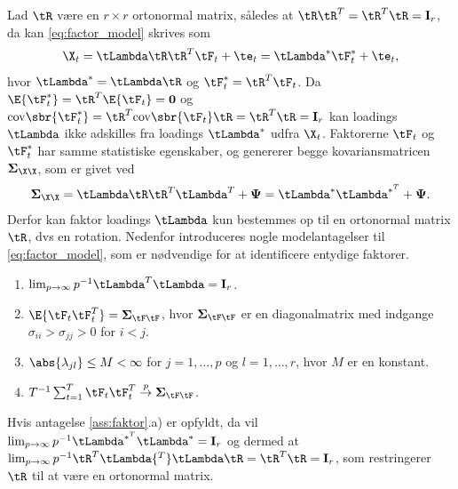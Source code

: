 Lad \(\tR\) være en \(r \times r\) ortonormal matrix, således at \(\tR \tR^T = \tR^T \tR = \mathbf{I}_r\), da kan \eqref{eq:factor_model} skrives som
\begin{align*}
\X_t = \tLambda \tR \tR^T \tF_t + \te_t = \tLambda^* \tF_t^* + \te_t,
\end{align*}
hvor \(\tLambda^*=\tLambda \tR\) og \(\tF_t^*=\tR^T \tF_t\). 
Da \(\E{\tF_t^*} = \tR^T \E{\tF_t} = \mathbf{0}\) og \(\text{cov} \sbr{\tF^*_t} = \tR^T \text{cov} \sbr{\tF_t} \tR = \tR^T \tR = \mathbf{I}_r\) kan loadings \(\tLambda\) ikke adskilles fra loadings \(\tLambda^*\) udfra \(\X_t\).
Faktorerne \(\tF_t\) og \(\tF^*_t\) har samme statistiske egenskaber, og genererer begge kovariansmatricen \(\boldsymbol{\Sigma}_{\X \X}\), som er givet ved
\begin{align*}
\boldsymbol{\Sigma}_{\X \X} = \tLambda \tR \tR^T \tLambda^T + \boldsymbol{\Psi} = \tLambda^* \tLambda^{*^T} + \boldsymbol{\Psi}.
\end{align*}
Derfor kan faktor loadings \(\tLambda\) kun bestemmes op til en ortonormal matrix \(\tR\), dvs en rotation.
Nedenfor introduceres nogle modelantagelser til \eqref{eq:factor_model}, som er nødvendige for at identificere entydige faktorer.
%
\begin{ass} \label{ass:faktor}
\begin{enumerate}[label=\alph*)]
\item \(\lim_{p \rightarrow \infty} p^{-1} \tLambda^T \tLambda = \mathbf{I}_r\). 
\item \(\E{\tF_t \tF_t^T} = \boldsymbol{\Sigma}_{\tF\tF}\), hvor \(\boldsymbol{\Sigma}_{\tF\tF}\) er en diagonalmatrix med indgange \(\sigma_{ii} > \sigma_{jj} > 0\) for \(i < j\).
\item \(\abs{\lambda_{jl}} \leq M < \infty\) for \(j = 1, \ldots, p\) og \(l= 1, \ldots, r\), hvor \(M\) er en konstant.
\item \(T^{-1} \sum_{t=1}^T \tF_t \tF_t^T \overset{p}{\rightarrow} \boldsymbol{\Sigma}_{\tF\tF}\).
\end{enumerate}
\end{ass}
%
Hvis antagelse \ref{ass:faktor}.a) er opfyldt, da vil \(\lim_{p \rightarrow \infty} p^{-1} \tLambda^{*^T} \tLambda^* = \mathbf{I}_r\) og dermed at \(\lim_{p \rightarrow \infty} p^{-1} \tR^T \tLambda{^T} \tLambda \tR = \tR^T \tR = \mathbf{I}_r\), som restringerer \(\tR\) til at være en ortonormal matrix.
